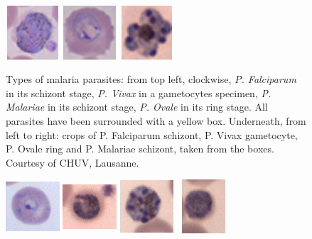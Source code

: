 \documentclass[final,a4paper,12pt,english]{UnicaPhdThesis3}
\begin{document}
{\begin{figure}[!t]
		\includegraphics[width=2cm, height=2cm]{images/malaria/f2_Pvivax_crop}
		\includegraphics[width=2cm, height=2cm]{images/malaria/f2_Povale_crop}
		\includegraphics[width=2cm, height=2cm]{images/malaria/f2_Pmalariae_crop}
		\caption{\label{fig5_malaria_types}Types of malaria parasites: from top left, clockwise, \emph{P. Falciparum} in its schizont stage, \emph{P. Vivax} in a gametocytes specimen, \emph{P. Malariae} in its schizont stage, \emph{P. Ovale} in its ring stage. All parasites have been surrounded with a yellow box. Underneath, from left to right: crops of P. Falciparum schizont, P. Vivax gametocyte, P. Ovale ring and P. Malariae schizont, taken from the boxes. Courtesy of CHUV, Lausanne.}
	\end{figure}
	
	\begin{figure}[!b]
		\centering
		\includegraphics[width=2cm, height=2cm]{images/malaria/falciparum_1_ring}
		\includegraphics[width=2cm, height=2cm]{images/malaria/falciparum_2_trophozoiteAge}
		\includegraphics[width=2cm, height=2cm]{images/malaria/falciparum_3_schizont}
		\includegraphics[width=2cm, height=2cm]{images/malaria/falciparum_4_gametocyte}
		

\end{figure}}
\end{document}
